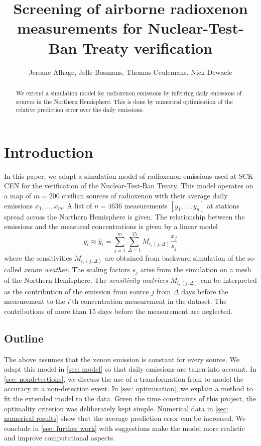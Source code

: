 \documentclass{article}
\title{Screening of airborne radioxenon measurements for Nuclear-Test-Ban Treaty verification}
\author{Jerome Alhage, Jelle Bosmans, Thomas Ceulemans, Nick Dewaele}
\date{}
\begin{document}
    \maketitle

    \begin{abstract}
        We extend a simulation model for radioxenon emissions by inferring daily emissions of sources in the Northern Hemisphere. This is done by numerical optimisation of the relative prediction error over the daily emissions.
    \end{abstract}

\section{Introduction}
In this paper, we adapt a simulation model of radioxenon emissions used at SCK-CEN for the verification of the Nuclear-Test-Ban Treaty. This model operates on a map of $m = 200$ civilian sources of radioxenon with their average daily emissions $x_1,\dots,x_m$. A list of $n = 4636$ measurements $[y_1,\dots,y_n]$ at stations spread across the Northern Hemisphere is given. The relationship between the emissions and the measured concentrations is given by a linear model 
\begin{equation}
    \label{eq: initial model}
y_i \approx
\hat{y}_i = \sum_{j=1}^m \sum_{\Delta = 1}^{15}  M_{i,(j,\Delta)} \frac{x_{j}}{s_j}
\end{equation}
where the sensitivities $M_{i,(j, \Delta)}$ are obtained from backward simulation of the so-called \emph{xenon weather}. The scaling factors $s_j$ arise from the simulation on a mesh of the Northern Hemisphere.
The \emph{sensitivity matrices} $M_{i,(j,\Delta)}$ can be interpreted as the contribution of the emission from source $j$ from $\Delta$ days before the measurement to the $i$'th concentration measurement in the dataset. The contributions of more than $15$ days before the measurement are neglected.

\subsection{Outline}
The above assumes that the xenon emission is constant for every source. We adapt this model in \cref{sec: model} so that daily emissions are taken into account. In \cref{sec: nondetections}, we discuss the use of a transformation from \cite{deMeutter2022uncertainty} to model the accuracy in a non-detection event.
In \cref{sec: optimisation}, we explain a method to fit the extended model to the data. Given the time constraints of this project, the optimality criterion was deliberately kept simple. Numerical data in \cref{sec: numerical results} show that the average prediction error can be increased. We conclude in \cref{sec: further work} with suggestions make the model more realistic and improve computational aspects.
\end{document}
